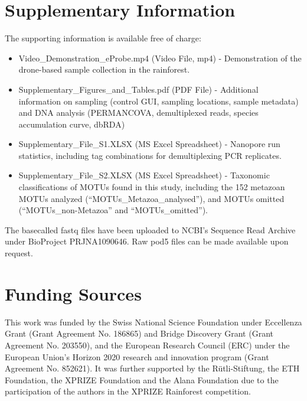 \section*{Supplementary Information}

The supporting information is available free of charge:
\begin{itemize}
  \item Video\_Demonstration\_eProbe.mp4 (Video File, mp4) - Demonstration of the drone-based sample collection in the rainforest.
  \item Supplementary\_Figures\_and\_Tables.pdf (PDF File) - Additional information on sampling (control GUI, sampling locations, sample metadata) and DNA analysis (PERMANCOVA, demultiplexed reads, species accumulation curve, dbRDA)
  \item Supplementary\_File\_S1.XLSX (MS Excel Spreadsheet) - Nanopore run statistics, including tag combinations for demultiplexing PCR replicates.
  \item Supplementary\_File\_S2.XLSX (MS Excel Spreadsheet) - Taxonomic classifications of MOTUs found in this study, including the 152 metazoan MOTUs analyzed (“MOTUs\_Metazoa\_analysed”), and MOTUs omitted (“MOTUs\_non-Metazoa” and “MOTUs\_omitted”). 
\end{itemize}

The basecalled fastq files have been uploaded to NCBI’s Sequence Read Archive under BioProject PRJNA1090646. Raw pod5 files can be made available upon request. 



\section*{Funding Sources}

This work was funded by the Swiss National Science Foundation under Eccellenza Grant (Grant Agreement No. 186865) and Bridge Discovery Grant (Grant Agreement No. 203550), and the European Research Council (ERC) under the European Union's Horizon 2020 research and innovation program (Grant Agreement No. 852621). It was further supported by the Rütli-Stiftung, the ETH Foundation, the XPRIZE Foundation and the Alana Foundation due to the participation of the authors in the XPRIZE Rainforest competition.

